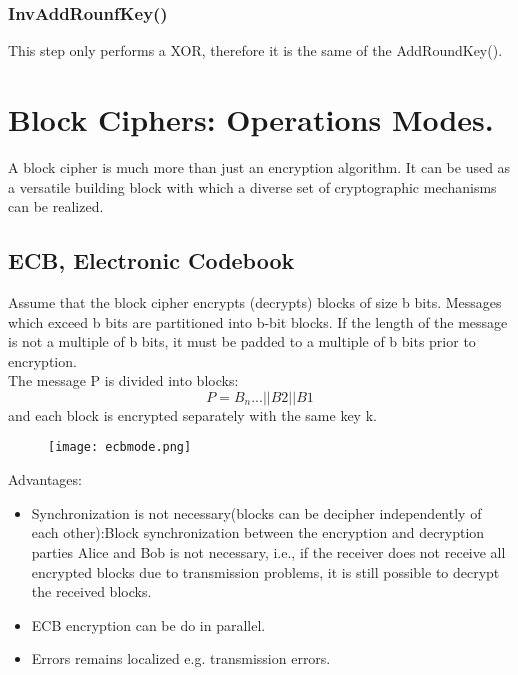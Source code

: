 \documentclass{article}
\begin{document}
\subsubsection{InvAddRounfKey()}
This step only performs a XOR, therefore it is the same of the AddRoundKey().




\section{Block Ciphers: Operations Modes.}
A block cipher is much more than just an encryption algorithm. It can be used as a versatile building block with which a diverse set of cryptographic mechanisms can be realized.

\subsection{ECB, Electronic Codebook}
Assume that the block cipher encrypts (decrypts)
blocks of size b bits. Messages which exceed b bits are partitioned into b-bit
blocks. If the length of the message is not a multiple of b bits, it must be padded to
a multiple of b bits prior to encryption.\\

The message P is divided into blocks:
$${P = B_n ... ||B2||B1}$$
and each block is encrypted separately with the same key k.
\begin{figure}[H]
    \centering
    \texttt{[image: ecbmode.png]}
\end{figure}

Advantages:
\begin{itemize}
    \item Synchronization is not necessary(blocks can be decipher independently of each other):Block synchronization between the encryption
and decryption parties Alice and Bob is not necessary, i.e., if the receiver does not
receive all encrypted blocks due to transmission problems, it is still possible to decrypt
the received blocks.
    \item ECB encryption can be do in parallel.
    \item Errors remains localized e.g. transmission errors.
\end{itemize}
\end{document}
